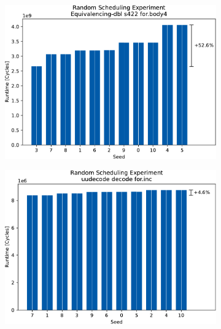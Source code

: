 \begin{figure}
    \begin{subfigure}{0.0325\textwidth}\caption{}\label{fig:eval:rndm:aurora:a}\end{subfigure}
    \begin{subfigure}{0.44\textwidth}
        \includegraphics[width=\textwidth]{img/random-scheduling-experiment-aurora-collected/Equivalencing-dbl-crop.pdf}
    \end{subfigure}
    \hfill
    \begin{subfigure}{0.0325\textwidth}\caption{}\label{fig:eval:rndm:aurora:b}\end{subfigure}
    \begin{subfigure}{0.44\textwidth}
        \includegraphics[width=\textwidth]{img/random-scheduling-experiment-aurora-collected/uudecode-crop.pdf}
    \end{subfigure}


\end{figure}
